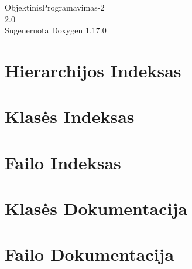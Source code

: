 \documentclass[twoside]{book}
\newcommand{\+}{\discretionary{\mbox{\scriptsize$\hookleftarrow$}}{}{}}
\newcommand{\clearemptydoublepage}{%
    \newpage{\pagestyle{empty}\cleardoublepage}%
  }
\begin{document}
  \raggedbottom
    \hypersetup{pageanchor=false,
                bookmarksnumbered=true,
                pdfencoding=unicode
               }
  \begin{titlepage}
  \vspace*{7cm}
  \begin{center}%
  {\Large Objektinis\+Programavimas-\/2}\\
  [1ex]\large 2.\+0 \\
  \vspace*{1cm}
  {\large Sugeneruota Doxygen 1.17.0}\\
  \end{center}
  \end{titlepage}
  \clearemptydoublepage
  \tableofcontents
  \clearemptydoublepage
  \hypersetup{pageanchor=true}
\chapter{Hierarchijos Indeksas}

\chapter{Klasės Indeksas}

\chapter{Failo Indeksas}

\chapter{Klasės Dokumentacija}





\chapter{Failo Dokumentacija}


























  \backmatter
  \newpage
  \clearemptydoublepage
  \printindex
\end{document}
